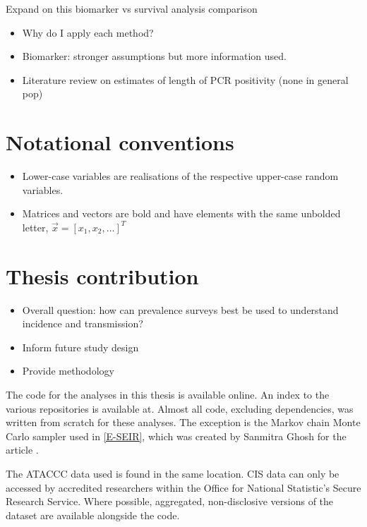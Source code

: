 \documentclass[thesis.tex]{subfiles}
\begin{document}
Expand on this biomarker vs survival analysis comparison
\begin{itemize}
    \item Why do I apply each method?
    \item Biomarker: stronger assumptions but more information used.
    \item Literature review on estimates of length of PCR positivity (none in general pop)
\end{itemize}

\section{Notational conventions}

\begin{itemize}
    \item Lower-case variables are realisations of the respective upper-case random variables.
    \item Matrices and vectors are bold and have elements with the same unbolded letter, \eg $\vec{x} = [x_1, x_2, \dots]^T$
\end{itemize}


\section{Thesis contribution}

\begin{itemize}
    \item Overall question: how can prevalence surveys best be used to understand incidence and transmission?
    \item Inform future study design
    \item Provide methodology
\end{itemize}

The code for the analyses in this thesis is available online.
An index to the various repositories is available at.
Almost all code, excluding dependencies, was written from scratch for these analyses.
The exception is the Markov chain Monte Carlo sampler used in \cref{E-SEIR}, which was created by Sanmitra Ghosh for the article \textcite{ghoshApproximate}.

The ATACCC data used is found in the same location.
CIS data can only be accessed by accredited researchers within the Office for National Statistic's Secure Research Service.
Where possible, aggregated, non-disclosive versions of the dataset are available alongside the code.
\end{document}
